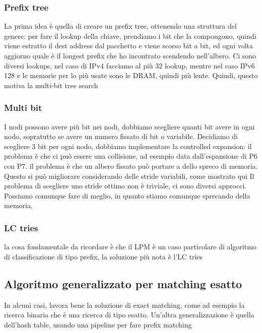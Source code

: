 \documentclass[12pt, oneside]{extbook} %
\begin{document}
\subsubsection{Prefix tree}
La prima idea è quella di creare un prefix tree, ottenendo una struttura del genere:
per fare il lookup della chiave, prendiamo i bit che la compongono, quindi viene estratto il dest address dal pacchetto e viene scorso bit a bit, ed ogni volta aggiorno quale è il longest prefix che ho incontrato scendendo nell'albero. Ci sono diversi lookups, nel caso di IPv4 facciamo al più 32 lookup, mentre nel caso IPv6 128 e le memorie per lo più usate sono le DRAM, quindi più lente. Quindi, questo motiva la multi-bit tree search
\subsubsection{Multi bit}
I nodi possono avere più bit nei nodi, dobbiamo scegliere quanti bit avere in ogni nodo, sopratutto se avere un numero fissato di bit o variabile. Decidiamo di scegliere 3 bit per ogni nodo, dobbiamo implementare la controlled expansion: il problema è che ci può essere una collisione, ad esempio data dall'espansione di P6 con P7.
il problema è che un albero fissato può portare a dello spreco di memoria. Questo si può migliorare considerando delle stride variabili, come mostrato qui
Il problema di scegliere uno stride ottimo non è triviale, ci sono diversi approcci. Possiamo comunque fare di meglio, in quanto stiamo comunque sprecando della memoria, 
\subsubsection{LC tries}
la cosa fondamentale da ricordare è che il LPM è un caso particolare di algoritmo di classificazione di tipo prefix, la soluzione più nota è l'LC tries
\subsection{Algoritmo generalizzato per matching esatto}
In alcuni casi, lavora bene la soluzione di exact matching, come ad esempio la ricerca binaria che è una ricerca di tipo esatto. Un'altra generalizzazione è quella dell'hash table, usando una pipeline per fare prefix matching
\end{document}
